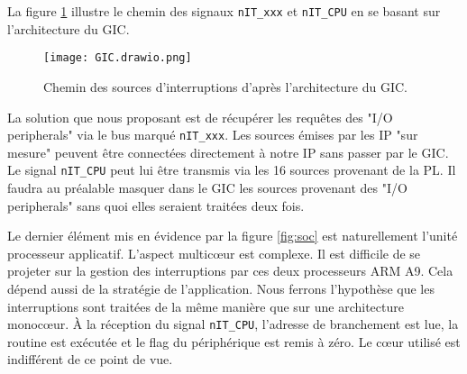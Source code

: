 La figure \ref{fig:GIC} illustre le chemin des signaux \texttt{nIT\_xxx} et \texttt{nIT\_CPU} en se basant sur l'architecture du GIC.
\begin{figure}[H]
    \centering
    \texttt{[image: GIC.drawio.png]}
    \caption{Chemin des sources d'interruptions d'après l'architecture du GIC.}
    \label{fig:GIC}
\end{figure}
La solution que nous proposant est de récupérer les requêtes des "I/O peripherals" via le bus marqué \texttt{nIT\_xxx}.
Les sources émises par les IP "sur mesure" peuvent être connectées directement à notre IP sans passer par le GIC.
Le signal \texttt{nIT\_CPU} peut lui être transmis via les 16 sources provenant de la PL.
Il faudra au préalable masquer dans le GIC les sources provenant des "I/O peripherals" sans quoi elles seraient traitées deux fois.

\gap
Le dernier élément mis en évidence par la figure \ref{fig:soc} est naturellement l'unité processeur applicatif.
L'aspect multicœur est complexe.
Il est difficile de se projeter sur la gestion des interruptions par ces deux processeurs ARM A9.
Cela dépend aussi de la stratégie de l'application.
Nous ferrons l'hypothèse que les interruptions sont traitées de la même manière que sur une architecture monocœur.
À la réception du signal \texttt{nIT\_CPU}, l'adresse de branchement est lue, la routine est exécutée et le flag du périphérique est remis à zéro.
Le cœur utilisé est indifférent de ce point de vue.
